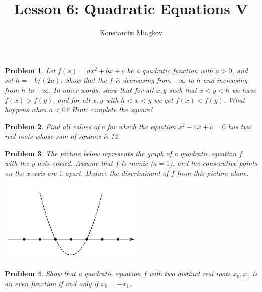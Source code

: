 \documentclass[a4paper,12pt]{article}
\author{Konstantin Miagkov}
\title{Lesson 6: Quadratic Equations V}
\theoremstyle{perfect}
\newtheorem{prb}{Problem}
\begin{document}
 
\maketitle

\begin{prb}
Let $f(x) = ax^2+bx+c$ be a quadratic function with $a > 0$, and set $h = -b/(2a)$. Show that the $f$ is decreasing from $-\infty$ to $h$ and increasing from $h$ to $+\infty$. In other words, show that for all $x,y$ such that $x < y < h$ we have $f(x) > f(y)$, and for all $x,y$ with $h < x < y$ we get $f(x) < f(y)$. What happens when $a < 0$? \textit{Hint: complete the square!}
\end{prb}

\begin{prb}
Find all values of $c$ for which the equation $x^2-4x+c = 0$ has two real roots whose sum of squares is 12.
\end{prb}

\begin{prb}
The picture below represents the graph of a quadratic equation $f$ with the $y$-axis erased. Assume that $f$ is monic ($a=1$), and the consecutive points on the $x$-axis are $1$ apart. Deduce the discriminant of $f$ from this picture alone.
\begin{center}
\includegraphics[scale=1.0]{parabola.jpg}
\end{center}
\end{prb}

\begin{prb}
Show that a quadratic equation $f$ with two distinct real roots $x_0, x_1$ is an even function if and only if $x_0 = -x_1$.
\end{prb}

\pagebreak
\end{document}
